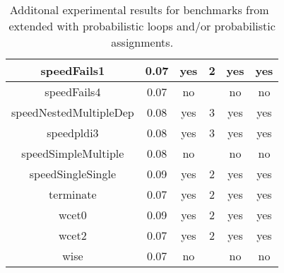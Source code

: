 \begin{center}
\begin{table}[]
\begin{tabular}{c|c|c|c|c|c}
{speedFails1} & {0.07} & {yes} & {2} & {yes} & {yes
} \\\hline
{speedFails4} & {0.07} & {no} & {} & {no} & {no
} \\\hline
{speedNestedMultipleDep} & {0.08} & {yes} & {3} & {yes} & {yes
} \\\hline
{speedpldi3} & {0.08} & {yes} & {3} & {yes} & {yes
} \\\hline
{speedSimpleMultiple} & {0.08} & {no} & {} & {no} & {no
} \\\hline
{speedSingleSingle} & {0.09} & {yes} & {2} & {yes} & {yes
} \\\hline
{terminate} & {0.07} & {yes} & {2} & {yes} & {yes
} \\\hline
{wcet0} & {0.09} & {yes} & {2} & {yes} & {yes
} \\\hline
{wcet2} & {0.07} & {yes} & {2} & {yes} & {yes
} \\\hline
{wise} & {0.07} & {no} & {} & {no} & {no} \\\hline 
    \end{tabular}
    \caption{Additonal experimental results for benchmarks from~\cite{ADFG10:lexicographic} extended with probabilistic loops and/or probabilistic assignments.}
    \label{tab:exp3}
\end{table}
\end{center}


